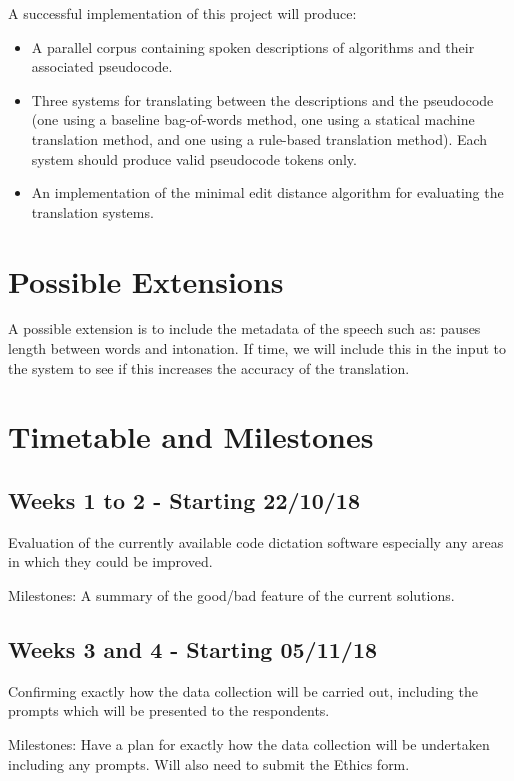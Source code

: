 \documentclass[12pt]{article}
\begin{document}
A successful implementation of this project will produce: 
\begin{itemize}
\item A parallel corpus containing spoken descriptions of algorithms and their associated pseudocode. 
\item Three systems for translating between the descriptions and the pseudocode (one using a baseline bag-of-words method, one using a statical machine translation method, and one using a rule-based translation method). Each system should produce valid pseudocode tokens only. 
\item An implementation of the minimal edit distance algorithm for evaluating the translation systems.
\end{itemize}

\section*{Possible Extensions}
A possible extension is to include the metadata of the speech such as: pauses length between words and intonation. If time, we will include this in the input to the system to see if this increases the 
accuracy of the translation.

\section*{Timetable and Milestones}

\subsection*{Weeks 1 to 2 - Starting 22/10/18}

Evaluation of the currently available code dictation software especially any areas in which they could be improved. 

Milestones: A summary of the good/bad feature of the current solutions.

\subsection*{Weeks 3 and 4 - Starting 05/11/18}

Confirming exactly how the data collection will be carried out, including the prompts which will
be presented to the respondents.

Milestones: Have a plan for exactly how the data collection will be undertaken including any prompts. Will also need to submit the Ethics form.
\end{document}
